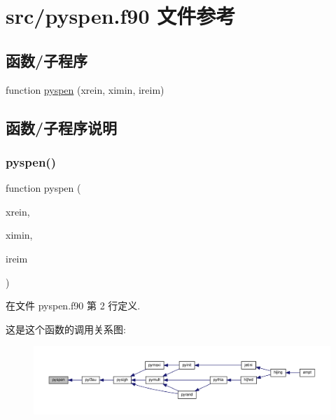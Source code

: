 \hypertarget{pyspen_8f90}{}\section{src/pyspen.f90 文件参考}
\label{pyspen_8f90}
\subsection*{函数/子程序}
\begin{DoxyCompactItemize}
\item 
function \mbox{\hyperlink{pyspen_8f90_a6dd0404a7683caab38475aa637117109}{pyspen}} (xrein, ximin, ireim)
\end{DoxyCompactItemize}


\subsection{函数/子程序说明}
\mbox{\label{pyspen_8f90_a6dd0404a7683caab38475aa637117109}} 
\subsubsection{\texorpdfstring{pyspen()}{pyspen()}}
{\footnotesize\ttfamily function pyspen (\begin{DoxyParamCaption}\item[{}]{xrein,  }\item[{}]{ximin,  }\item[{}]{ireim }\end{DoxyParamCaption})}



在文件 pyspen.\+f90 第 2 行定义.

这是这个函数的调用关系图\+:
\nopagebreak
\begin{figure}[H]
\begin{center}
\leavevmode
\includegraphics[width=350pt]{pyspen_8f90_a6dd0404a7683caab38475aa637117109_icgraph}
\end{center}
\end{figure}
